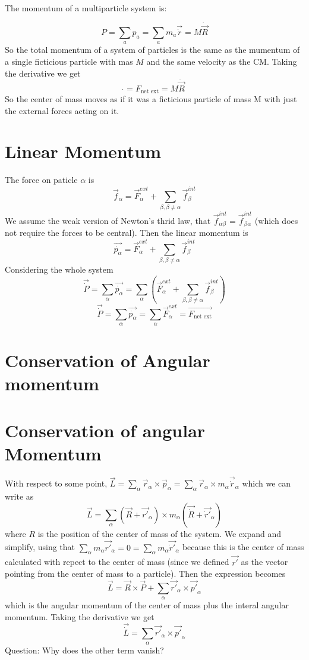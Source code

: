 \documentclass{homework}
\begin{document}
The momentum of a multiparticle system is:

\[P = \sum_{a}p_a =\sum_{a}m_a\vec{\dot{r}} = M\dot{\vec{R}} \]
So the total momentum of a system of particles is the same as the mumentum of a single ficticious particle with mas $M$ and the same velocity as the CM. Taking the derivative we get
\[\dot{} = F_{\text{net ext}} = M\ddot{\vec{R}} \]
So the center of mass moves as if it was a ficticious particle of mass M with just the external forces acting on it.

\section{Linear Momentum}

The force on paticle $\alpha$ is 
\[\vec{f}_{\alpha} = \vec{F}_{\alpha}^{ext} + \sum_{\beta, \beta \neq \alpha}\vec{f}_{\beta}^{int}\]
We assume the weak version of Newton's thrid law, that $\vec{f}_{\alpha\beta}^{int} = \vec{f}_{\beta\alpha}^{int}$ (which does not require the forces to be central). Then the linear momentum is
\[\vec{\dot{p_{\alpha}}} = \vec{F}_{\alpha}^{ext} + \sum_{\beta, \beta \neq \alpha}\vec{f}_{\beta}^{int}\]
Considering the whole system
\[\vec{\dot{P}} = \sum_{\alpha} \vec{\dot{p_{\alpha}}} = \sum_{\alpha}(\vec{F}_{\alpha}^{ext} + \sum_{\beta, \beta \neq \alpha}\vec{f}_{\beta}^{int})\]
\[\vec{\dot{P}} = \sum_{\alpha} \vec{\dot{p_{\alpha}}} = \sum_{\alpha}\vec{F}_{\alpha}^{ext} = \vec{F_{\text{net ext}} }\]

\section{Conservation of Angular momentum}


\section{Conservation of angular Momentum}
With respect to some point, $\vec{L} = \sum_{\alpha}\vec{r}_{\alpha} \times \vec{p}_{\alpha} = \sum_{\alpha}\vec{r}_{\alpha} \times  m_{\alpha}\vec{\dot{r}}_{\alpha}$ which we can write as 
\[\vec{L} = \sum_{\alpha} (\vec{R} + \vec{r'}_{\alpha}) \times m_{\alpha}(\vec{\dot{R}} + \vec{\dot{r}'}_{\alpha})\]
where $R$ is the position of the center of mass of the system. We expand and simplify, using that $\sum_{\alpha}m_{\alpha}\vec {r'}_{\alpha} = 0= \sum_{\alpha}m_{\alpha}\vec {\dot{r}'}_{\alpha}$ because this is the center of mass calculated with repect to the center of mass (since we defined $\vec{r'}$ as the vector pointing from the center of mass to a particle). Then the expression becomes
\[\vec{L} = \vec{R} \times \vec{P} + \sum_{\alpha}\vec{r'}_{\alpha} \times \vec{p'}_{\alpha}\]
which is the angular momentum of the center of mass plus the interal angular momentum. 
Taking the derivative we get
\[\vec{\dot{L}} = \sum_{\alpha}\vec{r'}_{\alpha} \times \vec{p'}_{\alpha}\]
Question: Why does the other term vanish?
\end{document}
